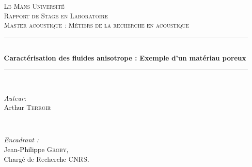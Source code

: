 \documentclass[twoside,openright]{report}
\begin{document}
\begin{titlepage}
\newcommand{\HRule}{\rule{\linewidth}{0.5mm}} %

\center %
 
\textsc{\LARGE Le Mans Université}\\[1.5cm] %
\textsc{\Large Rapport de Stage en Laboratoire}\\[0.5cm] %
\textsc{\large Master acoustique : Métiers de la recherche en acoustique}\\[0.5cm] %


\HRule \\[0.4cm]
{ \huge \bfseries Caractérisation des fluides anisotrope : Exemple d'un matériau poreux}\\[0.4cm] %
\HRule \\[1cm]
 

\begin{minipage}{0.4\textwidth}
\begin{flushleft} \Large
\emph{Auteur:}\\
Arthur \textsc{Terroir} %
\end{flushleft}
\end{minipage}
~
\begin{minipage}{0.1\textwidth}
\end{minipage}
\begin{minipage}{0.5\textwidth}
\Large{\emph{Encadrant :} \\ Jean-Philippe \textsc{Groby}},\\
\large Chargé de Recherche CNRS.
\end{minipage}\\[1cm]


\end{titlepage}
\end{document}
